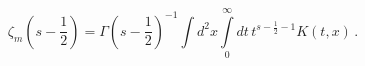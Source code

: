 \begin{equation}
\zeta_m \left( s-\frac 12\right)= \Gamma \left( s-\frac
12\right)^{-1} \int d^2x \int\limits_0^\infty dt\, t^{s-\frac 12
-1} K(t,x) \,.\label{zmKt}
\end{equation}

